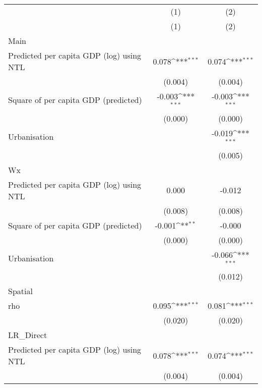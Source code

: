 {
\def\sym#1{\ifmmode^{#1}\else\(^{#1}\)\fi}
\begin{tabular}{l*{2}{c}}
\hline\hline
                    &\multicolumn{1}{c}{(1)}&\multicolumn{1}{c}{(2)}\\
                    &\multicolumn{1}{c}{(1)}&\multicolumn{1}{c}{(2)}\\
\hline
Main                &                     &                     \\
Predicted per capita GDP (log) using NTL&       0.078\sym{***}&       0.074\sym{***}\\
                    &     (0.004)         &     (0.004)         \\
[1em]
Square of per capita GDP (predicted)&      -0.003\sym{***}&      -0.003\sym{***}\\
                    &     (0.000)         &     (0.000)         \\
[1em]
Urbanisation        &                     &      -0.019\sym{***}\\
                    &                     &     (0.005)         \\
\hline
Wx                  &                     &                     \\
Predicted per capita GDP (log) using NTL&       0.000         &      -0.012         \\
                    &     (0.008)         &     (0.008)         \\
[1em]
Square of per capita GDP (predicted)&      -0.001\sym{**} &      -0.000         \\
                    &     (0.000)         &     (0.000)         \\
[1em]
Urbanisation        &                     &      -0.066\sym{***}\\
                    &                     &     (0.012)         \\
\hline
Spatial             &                     &                     \\
rho                 &       0.095\sym{***}&       0.081\sym{***}\\
                    &     (0.020)         &     (0.020)         \\
\hline
LR\_Direct           &                     &                     \\
Predicted per capita GDP (log) using NTL&       0.078\sym{***}&       0.074\sym{***}\\
                    &     (0.004)         &     (0.004)         \\

\end{tabular}}
